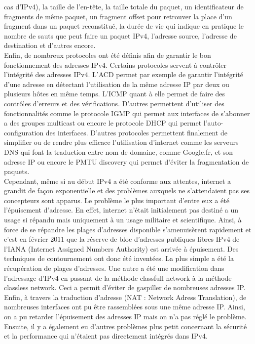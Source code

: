  cas d'IPv4), la taille de l'en-tête, la taille totale du paquet, un identificateur de 
fragments de même paquet, un fragment offset pour retrouver la place d'un fragment dans 
un paquet reconstitué, la durée de vie qui indique en pratique le nombre de sauts que 
peut faire un paquet IPv4, l'adresse source, l'adresse de destination et d'autres encore.
\\
Enfin, de nombreux protocoles ont été définis afin de garantir le bon fonctionnement des
 adresses IPv4. Certains protocoles servent à contrôler l'intégrité des adresses IPv4. L'ACD permet par exemple de garantir l'intégrité d'une adresse en détectant l'utilisation
de la même adresse IP par deux ou plusieurs hôtes en même temps. 
L'ICMP quant à elle permet de faire des contrôles d'erreurs et des vérifications.
D'autres permettent d'utiliser des fonctionnalités comme le protocole IGMP qui permet aux 
interfaces de s'abonner a des groupes multicast ou encore le protocole DHCP qui permet 
l'auto-configuration des interfaces. D'autres protocoles permettent finalement de simplifier
 ou de rendre plus efficace  l'utilisation d'internet comme les serveurs DNS qui font la
 traduction entre nom de domaine, comme Google.fr, et son adresse IP ou encore le PMTU 
discovery qui permet d'éviter la fragmentation de paquets.
\\
Cependant, même si au début IPv4 a été conforme aux attentes, internet a grandit de façon
 exponentielle et des problèmes auxquels ne s'attendaient pas ses concepteurs sont apparus.
Le problème le plus important d'entre eux a été l'épuisement d'adresse. En effet, internet n'était 
initialement pas destiné a un usage si répandu mais uniquement à un usage militaire et scientifique. 
Ainsi, à force de se répandre les plages d'adresses disponible s'amenuisèrent rapidement
 et c'est en février 2011 que la réserve de bloc d'adresses publiques libres IPv4 de
 l'IANA (Internet Assigned 
Numbers Authority) est arrivée à épuisement. Des techniques de contournement ont donc été
 inventées.  La plus simple a été la récupération de plages d'adresses. Une autre a été une
 modification dans l'adressage d'IPv4 en passant de la méthode classfull network à la
 méthode classless network. Ceci a permit d'éviter de gaspiller de nombreuses adresses
 IP. Enfin, à travers la traduction d'adresse (NAT : Network Adress Translation), de
 nombreuses interfaces ont pu être rassemblées sous une même adresse IP. Ainsi, on a pu
 retarder l'épuisement des adresses IP mais on n'a pas réglé le problème.
\\
Ensuite, il y a également eu d'autres problèmes plus petit concernant la sécurité et la performance qui n'étaient pas directement intégrés dans IPv4. 
